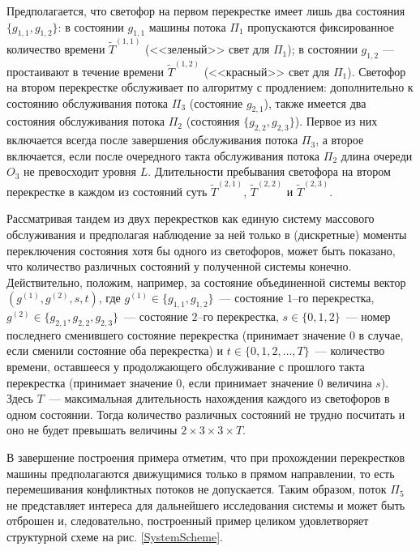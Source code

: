 \documentclass[a4paper,12pt,russian]{extarticle}
\begin{document}
Предполагается, что светофор на первом перекрестке имеет лишь два состояния $\{g_{1,1},g_{1,2}\}$: в состоянии $g_{1,1}$ машины потока $\Pi_1$ пропускаются фиксированное количество времени $\widetilde T^{(1,1)}$ (<<зеленый>> свет для $\Pi_1$); в состоянии $g_{1,2}$ --- простаивают в течение времени $\widetilde T^{(1,2)}$ (<<красный>> свет для $\Pi_1$). Светофор на втором перекрестке обслуживает по алгоритму с продлением: дополнительно к состоянию обслуживания потока $\Pi_3$ (состояние $g_{2,1}$), также имеется два состояния обслуживания потока $\Pi_2$ (состояния $\{g_{2,2},g_{2,3}\}$). Первое из них включается всегда после завершения обслуживания потока $\Pi_3$, а второе включается, если после очередного такта обслуживания потока $\Pi_2$ длина очереди $O_3$ не превосходит уровня $L$.
Длительности пребывания светофора на втором перекрестке в каждом из состояний суть $\widetilde T^{(2,1)}$, $\widetilde T^{(2,2)}$ и $\widetilde T^{(2,3)}$.


Рассматривая тандем из двух перекрестков как единую систему массового обслуживания и предполагая наблюдение за ней только в (дискретные) моменты переключения состояния хотя бы одного из светофоров, может быть показано, что количество различных состояний у полученной системы конечно. Действительно, положим, например, за состояние объединенной системы вектор $(g^{(1)},g^{(2)}, s, t)$, где $g^{(1)}\in \{g_{1,1},g_{1,2}\}$~--- состояние $1$--го перекрестка, $g^{(2)}\in \{g_{2,1},g_{2,2},g_{2,3}\}$~--- состояние $2$--го перекрестка, $s \in \{0, 1, 2\}$~--- номер последнего сменившего состояние перекрестка (принимает значение $0$ в случае, если сменили состояние оба перекрестка) и $t \in \{0, 1, 2, \ldots, T\}$~--- количество времени, оставшееся у продолжающего обслуживание с прошлого такта перекрестка (принимает значение $0$, если принимает значение $0$ величина $s$). Здесь $T$~--- максимальная длительность нахождения каждого из светофоров в одном состоянии. Тогда количество различных состояний не трудно посчитать и оно не будет превышать величины  $2\times 3 \times 3 \times T$.

В завершение построения примера отметим, что при прохождении перекрестков машины предполагаются движущимися только в прямом направлении, то есть перемешивания конфликтных потоков не допускается. Таким образом, поток $\Pi_5$ не представляет интереса для дальнейшего исследования системы и может быть отброшен и, следовательно, построенный пример целиком удовлетворяет структурной схеме на рис. \ref{SystemScheme}.
\end{document}
